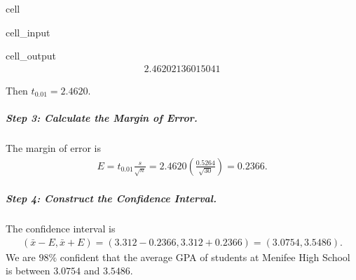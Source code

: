 \documentclass[letterpaper,10pt,english]{jupyterBook}
\begin{document}
\begin{sphinxuseclass}{cell}\begin{sphinxVerbatimInput}

\begin{sphinxuseclass}{cell_input}
\begin{sphinxVerbatim}[commandchars=\\\{\}]
\end{sphinxVerbatim}

\end{sphinxuseclass}\end{sphinxVerbatimInput}
\begin{sphinxVerbatimOutput}

\begin{sphinxuseclass}{cell_output}\begin{equation*}
\begin{split}2.46202136015041\end{split}
\end{equation*}
\end{sphinxuseclass}\end{sphinxVerbatimOutput}

\end{sphinxuseclass}
\sphinxAtStartPar
Then \(t_{0.01} = 2.4620\).


\subparagraph{Step 3: Calculate the Margin of Error.}
\label{\detokenize{Ch5 Confidence Intervals/5.4 Estimating Population Means (Sigma Unknown):id4}}
\sphinxAtStartPar
The margin of error is
\begin{equation*}
\begin{split} E = t_{0.01}\frac{s}{\sqrt{n}} = 2.4620\left(\frac{0.5264}{\sqrt{30}}\right) = 0.2366. \end{split}
\end{equation*}

\subparagraph{Step 4: Construct the Confidence Interval.}
\label{\detokenize{Ch5 Confidence Intervals/5.4 Estimating Population Means (Sigma Unknown):id5}}
\sphinxAtStartPar
The confidence interval is
\begin{equation*}
\begin{split}(\bar{x} - E, \bar{x} + E) = (3.312 - 0.2366, 3.312 + 0.2366) = (3.0754, 3.5486).\end{split}
\end{equation*}
\sphinxAtStartPar
We are \(98\%\) confident that the average GPA of students at Menifee High School is between \(3.0754\) and \(3.5486\).
\end{document}
